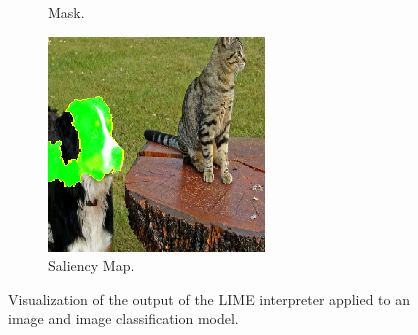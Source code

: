 \begin{figure}[ht]
\begin{subfigure}{0.32\linewidth}
    \caption{Mask.}
    \label{fig:bird-a}
  \end{subfigure}
  \begin{subfigure}{0.32\linewidth}
    \includegraphics[width=\linewidth]{figures/lime_dog_map1.png}
    \caption{Saliency Map.}
    \label{fig:bird-a}
  \end{subfigure}
  \caption{Visualization of the output of the LIME interpreter applied to an image and image classification model.}\label{fig:lime_cat}
  \vspace{-0.3cm}
\end{figure}


